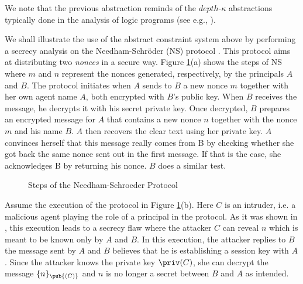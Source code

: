 \documentclass{tlp}
\begin{document}
We note that the previous abstraction reminds of 
the $depth\mbox{-}\kappa$ abstractions typically done 
in the analysis of logic programs (see e.g., \cite{ST84}). 

We shall illustrate the use of the abstract constraint system above by performing a secrecy analysis on the
Needham-Schr\"oder  (NS) protocol \cite{lowe95attack}. This protocol aims at distributing two \emph{nonces} in a secure way. 
Figure \ref{fig:ns}(a) shows the steps of NS where $m$ and $n$ represent  the nonces generated, respectively,  by the principals $A$ and $B$.
The protocol initiates when 
$A$ sends to $B$ a new 
nonce $m$ together with her own agent name $A$, both encrypted with $B$'s public key. When $B$ receives the message,
he decrypts it with his secret private key. Once decrypted, 
$B$ prepares an encrypted message for $A$ that contains 
a new nonce $n$ together with the nonce  $m$ and his name $B$.   $A$ then 
recovers the clear text using her private key. $A$ convinces 
herself that this message really comes from B by checking 
whether she got back the same nonce sent out in the first 
message. If that is the case, she acknowledges B by returning his nonce. 
$B$ does a similar test. 
\begin{figure}
\caption {Steps of the Needham-Schroeder Protocol \label{fig:ns}}
\end{figure}


Assume the execution of the protocol in Figure \ref{fig:ns}(b). Here $C$ is an intruder, i.e. a malicious agent playing the role of a principal in the protocol. As it was shown in \cite{lowe95attack}, this execution leads to a secrecy flaw where the attacker $C$ can reveal  $n$ which is meant to be known only by $A$ and $B$. 
In this execution, the attacker replies to $B$ the message sent by $A$ and $B$ believes that he is establishing a session key with $A$. Since the attacker knows the private key $\priv(C)$, she can decrypt the message $\{n\}_{\pub{(C)}}$ and $n$ is no longer a secret between $B$ and $A$ as intended. 
\end{document}
